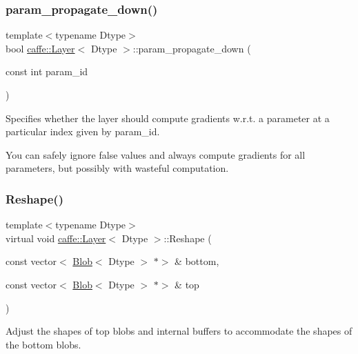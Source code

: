 \subsubsection{\texorpdfstring{param\+\_\+propagate\+\_\+down()}{param\_propagate\_down()}\hspace{0.1cm}{\footnotesize\ttfamily [2/2]}}
{\footnotesize\ttfamily template$<$typename Dtype$>$ \\
bool \mbox{\hyperlink{classcaffe_1_1_layer}{caffe\+::\+Layer}}$<$ Dtype $>$\+::param\+\_\+propagate\+\_\+down (\begin{DoxyParamCaption}\item[{const int}]{param\+\_\+id }\end{DoxyParamCaption})\hspace{0.3cm}{\ttfamily [inline]}}



Specifies whether the layer should compute gradients w.\+r.\+t. a parameter at a particular index given by param\+\_\+id. 

You can safely ignore false values and always compute gradients for all parameters, but possibly with wasteful computation. \mbox{\label{classcaffe_1_1_layer_a7fe981e8af8d93d587acf2a952be563d}} 
\subsubsection{\texorpdfstring{Reshape()}{Reshape()}\hspace{0.1cm}{\footnotesize\ttfamily [1/2]}}
{\footnotesize\ttfamily template$<$typename Dtype$>$ \\
virtual void \mbox{\hyperlink{classcaffe_1_1_layer}{caffe\+::\+Layer}}$<$ Dtype $>$\+::Reshape (\begin{DoxyParamCaption}\item[{const vector$<$ \mbox{\hyperlink{classcaffe_1_1_blob}{Blob}}$<$ Dtype $>$ $\ast$$>$ \&}]{bottom,  }\item[{const vector$<$ \mbox{\hyperlink{classcaffe_1_1_blob}{Blob}}$<$ Dtype $>$ $\ast$$>$ \&}]{top }\end{DoxyParamCaption})\hspace{0.3cm}{\ttfamily [pure virtual]}}



Adjust the shapes of top blobs and internal buffers to accommodate the shapes of the bottom blobs. 


